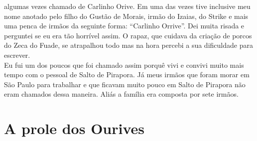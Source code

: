 \documentclass[12pt,brazil,]{book}
\begin{document}
algumas vezes chamado de Carlinho Orive. Em uma das vezes tive inclusive
meu nome anotado pelo filho do Gustão de Morais, irmão do Izaias, do
Strike e mais uma penca de irmãos da seguinte forma: ``Carlinho
Orrive''. Dei muita risada e perguntei se eu era tão horrível assim. O
rapaz, que cuidava da criação de porcos do Zeca do Fuade, se atrapalhou
todo mas na hora percebi a sua dificuldade para escrever.\\
Eu fui um dos poucos que foi chamado assim porquê vivi e convivi muito
mais tempo com o pessoal de Salto de Pirapora. Já meus irmãos que foram
morar em São Paulo para trabalhar e que ficavam muito pouco em Salto de
Pirapora não eram chamados dessa maneira. Aliás a família era composta
por sete irmãos.

\section{A prole dos Ourives}\label{a-prole-dos-ourives}
\end{document}
